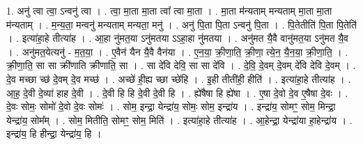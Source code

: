 \documentclass[17pt]{extarticle}
\begin{document}
1. अनु॑ त्वा त्वा॒ ऽन्वनु॑ त्वा । . त्वा॒ मा॒ता मा॒ता त्वा᳚ त्वा मा॒ता । . मा॒ता म॑न्यताम् मन्यताम् मा॒ता मा॒ता म॑न्यताम् । . म॒न्य॒ता॒ मन्वनु॑ मन्यताम् मन्यता॒ मनु॑ । . अनु॑ पि॒ता पि॒ता ऽन्वनु॑ पि॒ता । . पि॒तेतीति॑ पि॒ता पि॒तेति॑ । . इत्या॑हा॒हे तीत्या॑ह । . आ॒हा नु॑मत॒या ऽनु॑मतया ऽऽहा॒हा नु॑मतया । . अनु॑मत यै॒वै वानु॑मत॒या ऽनु॑मत यै॒व । . अनु॑मत॒येत्यनु॑ - म॒त॒या॒ । . ए॒वैन॑ यैन यै॒वै वैन॑या । . ए॒न॒या॒ क्री॒णा॒ति॒ क्री॒णा॒ त्ये॒न॒ यै॒न॒या॒ क्री॒णा॒ति॒ । . क्री॒णा॒ति॒ सा सा क्री॑णाति क्रीणाति॒ सा । . सा दे॑वि देवि॒ सा सा दे॑वि । . दे॒वि॒ दे॒वम् दे॒वम् दे॑वि देवि दे॒वम् । . दे॒व मच्छा च्छ॑ दे॒वम् दे॒व मच्छ॑ । . अच्छे॑ ही॒ह्य च्छा च्छे॑हि । . इ॒ही तीती॑ही॒ हीति॑ । . इत्या॑हा॒हे तीत्या॑ह । . आ॒ह॒ दे॒वी दे॒व्या॑ हाह दे॒वी । . दे॒वी हि हि दे॒वी दे॒वी हि । . ह्ये॑षैषा हि ह्ये॑षा । . ए॒षा दे॒वो दे॒व ए॒षैषा दे॒वः । . दे॒वः सोमः॒ सोमो॑ दे॒वो दे॒वः सोमः॑ । . सोम॒ इन्द्रा॒ येन्द्रा॑य॒ सोमः॒ सोम॒ इन्द्रा॑य । . इन्द्रा॑य॒ सोमꣳ॒॒ सोम॒ मिन्द्रा॒ येन्द्रा॑य॒ सोम᳚म् । . सोम॒ मितीति॒ सोमꣳ॒॒ सोम॒ मिति॑ । . इत्या॑हा॒हे तीत्या॑ह । . आ॒हेन्द्रा॒ येन्द्रा॑या हा॒हेन्द्रा॑य । . इन्द्रा॑य॒ हि हीन्द्रा॒ येन्द्रा॑य॒ हि । \newline
\end{document}

